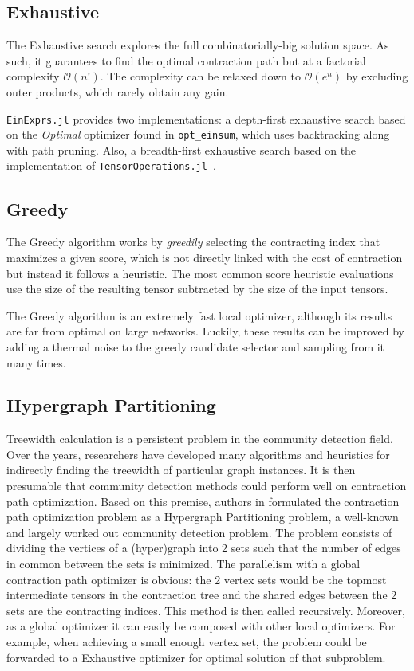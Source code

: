 \documentclass{juliacon}
\begin{document}
\subsection{Exhaustive}
The Exhaustive search explores the full combinatorially-big solution space.
As such, it guarantees to find the optimal contraction path but at a factorial complexity $\mathcal{O}(n!)$. The complexity can be relaxed down to $\mathcal{O}(e^n)$ by excluding outer products, which rarely obtain any gain.

\texttt{EinExprs.jl} provides two implementations: a depth-first exhaustive search based on the \textit{Optimal} optimizer found in \texttt{opt\_einsum}, which uses backtracking along with path pruning. Also, a breadth-first exhaustive search based on the implementation of \texttt{TensorOperations.jl}~\cite{pfeifer2014faster}.

\subsection{Greedy}
The Greedy algorithm works by \textit{greedily} selecting the contracting index that maximizes a given score, which is not directly linked with the cost of contraction but instead it follows a heuristic. The most common score heuristic evaluations use the size of the resulting tensor subtracted by the size of the input tensors.

The Greedy algorithm is an extremely fast local optimizer, although its results are far from optimal on large networks. Luckily, these results can be improved by adding a thermal noise to the greedy candidate selector and sampling from it many times.

\subsection{Hypergraph Partitioning}

Treewidth calculation is a persistent problem in the community detection field.
Over the years, researchers have developed many algorithms and heuristics for indirectly finding the treewidth of particular graph instances.
It is then presumable that community detection methods could perform well on contraction path optimization.
Based on this premise, authors in \cite{gray2021hyper} formulated the contraction path optimization problem as a Hypergraph Partitioning problem, a well-known and largely worked out community detection problem.
The problem consists of dividing the vertices of a (hyper)graph into 2 sets such that the number of edges in common between the sets is minimized.
The parallelism with a global contraction path optimizer is obvious: the 2 vertex sets would be the topmost intermediate tensors in the contraction tree and the shared edges between the 2 sets are the contracting indices.
This method is then called recursively. Moreover, as a global optimizer it can easily be composed with other local optimizers.
For example, when achieving a small enough vertex set, the problem could be forwarded to a Exhaustive optimizer for optimal solution of that subproblem. 
\end{document}
